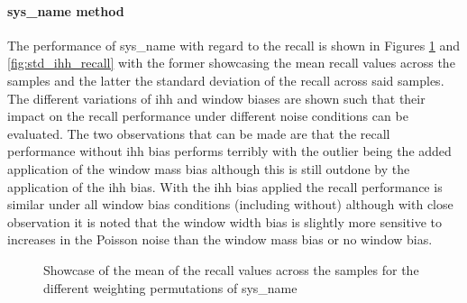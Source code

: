 \paragraph{\gls{sys_name} method}
The performance of \gls{sys_name} with regard to the recall is shown in Figures \ref{fig:mean_ihh_recall} and \ref{fig:std_ihh_recall} with the former showcasing the mean recall values across the samples and the latter the standard deviation of the recall across said samples. The different variations of \gls{ihh} and window biases are shown such that their impact on the recall performance under different noise conditions can be evaluated. The two observations that can be made are that the recall performance without \gls{ihh} bias performs terribly with the outlier being the added application of the window mass bias although this is still outdone by the application of the \gls{ihh} bias. With the \gls{ihh} bias applied the recall performance is similar under all window bias conditions (including without) although with close observation it is noted that the window width bias is slightly more sensitive to increases in the Poisson noise than the window mass bias or no window bias.

\begin{figure}[h!]
    \centering
    \caption[Showcase of the mean of the recall values across the samples for the different weighting permutations of AHT]{Showcase of the mean of the recall values across the samples for the different weighting permutations of \gls{sys_name}}
    \label{fig:mean_ihh_recall}
\end{figure}

